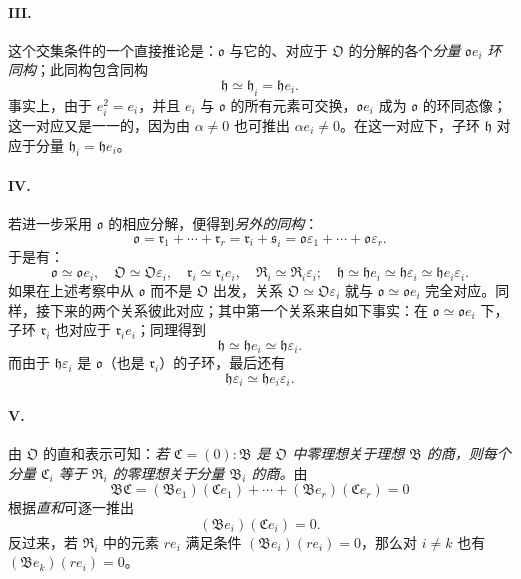 \documentclass[11pt]{article}
\begin{document}
\paragraph{III.}
这个交集条件的一个直接推论是：$\mathfrak o$ 与它的、对应于 $\mathfrak O$ 的分解的各个\emph{分量} $\mathfrak o e_i$ \emph{环同构}；此同构包含同构
\[
\mathfrak h\simeq\mathfrak h_i=\mathfrak h e_i.
\]
事实上，由于 $e_i^2=e_i$，并且 $e_i$ 与 $\mathfrak o$ 的所有元素可交换，$\mathfrak o e_i$ 成为 $\mathfrak o$ 的环同态像；这一对应又是一一的，因为由 $\alpha\ne0$ 也可推出 $\alpha e_i\ne0$。在这一对应下，子环 $\mathfrak h$ 对应于分量 $\mathfrak h_i=\mathfrak h e_i$。

\paragraph{IV.}
若进一步采用 $\mathfrak o$ 的相应分解，便得到\emph{另外的同构}：
\[
\mathfrak o=\mathfrak r_1+\cdots+\mathfrak r_r
=\mathfrak r_i+\mathfrak s_i
=\mathfrak o\varepsilon_1+\cdots+\mathfrak o\varepsilon_r.
\]
于是有：
\[
\mathfrak o\simeq\mathfrak o e_i,
\quad \mathfrak O\simeq\mathfrak O\varepsilon_i,
\quad \mathfrak r_i\simeq\mathfrak r_i e_i,
\quad \mathfrak R_i\simeq\mathfrak R_i\varepsilon_i;
\quad \mathfrak h\simeq\mathfrak h e_i\simeq\mathfrak h\varepsilon_i\simeq\mathfrak h e_i\varepsilon_i.
\]
如果在上述考察中从 $\mathfrak o$ 而不是 $\mathfrak O$ 出发，关系 $\mathfrak O\simeq\mathfrak O\varepsilon_i$ 就与 $\mathfrak o\simeq\mathfrak o e_i$ 完全对应。同样，接下来的两个关系彼此对应；其中第一个关系来自如下事实：在 $\mathfrak o\simeq\mathfrak o e_i$ 下，子环 $\mathfrak r_i$ 也对应于 $\mathfrak r_i e_i$；同理得到
\[
\mathfrak h\simeq\mathfrak h e_i\simeq\mathfrak h\varepsilon_i.
\]
而由于 $\mathfrak h\varepsilon_i$ 是 $\mathfrak o$（也是 $\mathfrak r_i$）的子环，最后还有
\[
\mathfrak h\varepsilon_i\simeq\mathfrak h e_i\varepsilon_i.
\]

\paragraph{V.}
由 $\mathfrak O$ 的直和表示可知：\emph{若 $\mathfrak C=(0):\mathfrak B$ 是 $\mathfrak O$ 中零理想关于理想 $\mathfrak B$ 的商，则每个分量 $\mathfrak C_i$ 等于 $\mathfrak R_i$ 的零理想关于分量 $\mathfrak B_i$ 的商。}由
\[
\mathfrak B\mathfrak C=(\mathfrak B e_1)(\mathfrak C e_1)+\cdots+(\mathfrak B e_r)(\mathfrak C e_r)=0
\]
根据\emph{直和}可逐一推出
\[
(\mathfrak B e_i)(\mathfrak C e_i)=0.
\]
反过来，若 $\mathfrak R_i$ 中的元素 $r e_i$ 满足条件 $(\mathfrak B e_i)(r e_i)=0$，那么对 $i\ne k$ 也有 $(\mathfrak B e_k)(r e_i)=0$。
\end{document}
